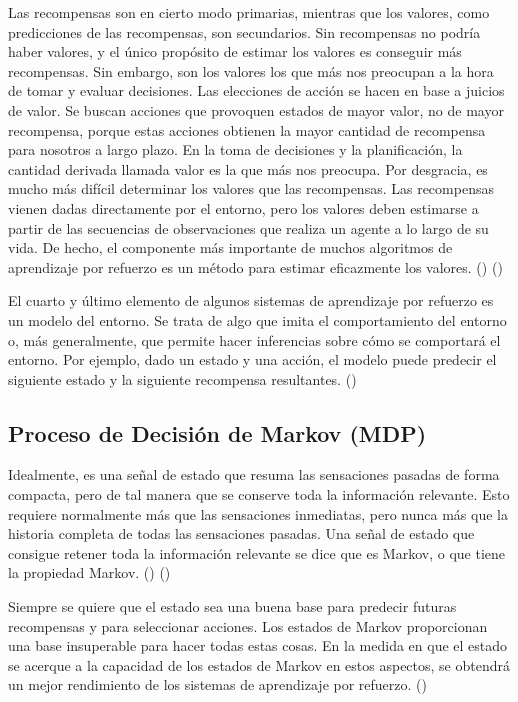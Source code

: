 Las recompensas son en cierto modo primarias, mientras que los valores, como predicciones de las recompensas, son secundarios. Sin recompensas no podría haber valores, y el único propósito de estimar los valores es conseguir más recompensas. Sin embargo, son los valores los que más nos preocupan a la hora de tomar y evaluar decisiones. Las elecciones de acción se hacen en base a juicios de valor. Se buscan acciones que provoquen estados de mayor valor, no de mayor recompensa, porque estas acciones obtienen la mayor cantidad de recompensa para nosotros a largo plazo. En la toma de decisiones y la planificación, la cantidad derivada llamada valor es la que más nos preocupa. Por desgracia, es mucho más difícil determinar los valores que las recompensas. Las recompensas vienen dadas directamente por el entorno, pero los valores deben estimarse a partir de las secuencias de observaciones que realiza un agente a lo largo de su vida. De hecho, el componente más importante de muchos algoritmos de aprendizaje por refuerzo es un método para estimar eficazmente los valores. (\cite{sutton1998introduction}) (\cite{rao2000reinforcement})

El cuarto y último elemento de algunos sistemas de aprendizaje por refuerzo es un modelo del entorno. Se trata de algo que imita el comportamiento del entorno o, más generalmente, que permite hacer inferencias sobre cómo se comportará el entorno. Por ejemplo, dado un estado y una acción, el modelo puede predecir el siguiente estado y la siguiente recompensa resultantes. (\cite{sutton1998introduction})

\subsection{Proceso de Decisión de Markov (MDP)}

Idealmente, es una señal de estado que resuma las sensaciones pasadas de forma compacta, pero de tal manera que se conserve toda la información relevante. Esto requiere normalmente más que las sensaciones inmediatas, pero nunca más que la historia completa de todas las sensaciones pasadas. Una señal de estado que consigue retener toda la información relevante se dice que es Markov, o que tiene la propiedad Markov. (\cite{rao2000reinforcement}) (\cite{wiering2012reinforcement})

Siempre se quiere que el estado sea una buena base para predecir futuras recompensas y para seleccionar acciones. Los estados de Markov proporcionan una base insuperable para hacer todas estas cosas. En la medida en que el estado se acerque a la capacidad de los estados de Markov en estos aspectos, se obtendrá un mejor rendimiento de los sistemas de aprendizaje por refuerzo. (\cite{wiering2012reinforcement})

